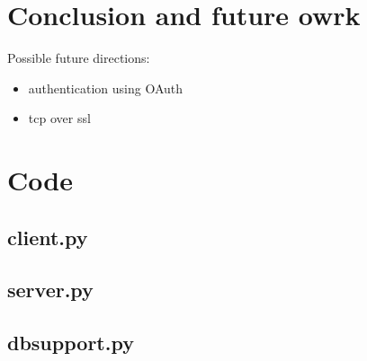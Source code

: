 \documentclass[a4paper,12pt]{article}
\begin{document}
\section{Conclusion and future owrk}

Possible future directions:
\begin{itemize}
 \item authentication using OAuth
 \item tcp over ssl
\end{itemize}


\section{Code}

\subsection{client.py}
\begin{alltt}

\end{alltt}

\subsection{server.py}




\subsection{dbsupport.py}
\begin{alltt}

\end{alltt}





% 
% 
% 
% 
% 
% 
\end{document}
